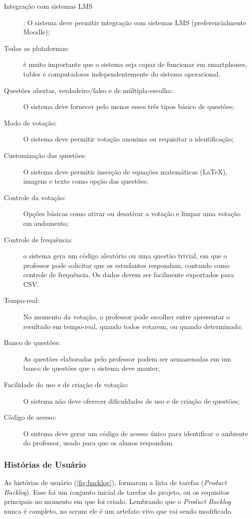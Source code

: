 \begin{description}
\item[Integração com sistemas LMS]: O sistema deve permitir integração com
sistemas LMS (preferencialmente Moodle);
\item[Todas as plataformas:] é muito importante que o sistema seja capaz
de funcionar em smartphones, tables e computadores independentemente
do sistema operacional.
\item[Questões abertas, verdadeiro/falso e de múltipla-escolha:] O sistema
deve fornecer pelo menos esses três tipos básico de questões;
\item[Modo de votação:] O sistema deve permitir votação anonima ou requisitar
a identificação;
\item[Customização das questões:] O sistema deve permitir inserção de equações
matemáticas (\LaTeX), imagens e texto como opção das questões;
\item[Controle da votação:] Opções básicas como ativar ou desativar a votação
e limpar uma votação em andamento;
\item[Controle de frequência:] o sistema gera um código aleatório ou uma
questão trivial, em que o professor pode solicitar que os estudantes
respondam, contando como controle de frequência. Os dados devem ser
facilmente exportados para CSV.
\item[Tempo-real:] No momento da votação, o professor pode escolher entre
apresentar o resultado em tempo-real, quando todos votarem, ou quando
determinado;
\item[Banco de questões:] As questões elaboradas pelo professor podem ser
armazenadas em um banco de questões que o sistema deve manter;
\item[Facilidade do uso e de criação de votação:] O sistema não deve oferecer
dificuldades de uso e de criação de questões;
\item[Código de acesso:] O sistema deve gerar um código de acesso único para
identificar o ambiente do professor, usado para que os alunos respondam.
\end{description}

\subsubsection{Histórias de Usuário}

As histórias de usuário (\autoref{fig:backlog}), formaram a lista de tarefas (\textit{Product Backlog}).
Esse foi um conjunto inicial de tarefas do projeto, ou os requisitos principais no momento em que foi criado.
Lembrando que o \textit{Product Backlog} nunca é completo, no scrum ele é um artefato vivo que vai sendo modificado.

